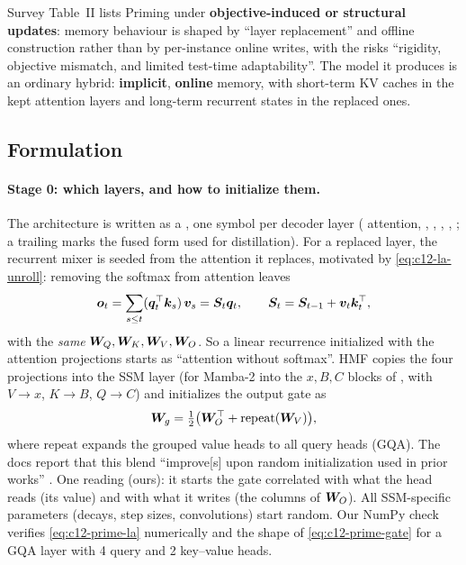 \begin{taxonomy}
Survey Table~II \citep{zhoubian2026memory} lists Priming under \textbf{objective-induced or
structural updates}: memory behaviour is shaped by ``layer replacement'' and offline construction
rather than by per-instance online writes, with the risks ``rigidity, objective mismatch, and
limited test-time adaptability''. The model it produces is an ordinary hybrid: \textbf{implicit},
\textbf{online} memory, with short-term KV caches in the kept attention layers and long-term
recurrent states in the replaced ones.
\end{taxonomy}

\subsection{Formulation}

\paragraph{Stage 0: which layers, and how to initialize them.} The architecture is written as a
, one symbol per decoder layer (\code{*} attention, ,
, , , ; a trailing \code{*} marks the fused form used for
distillation). For a replaced layer, the recurrent mixer is seeded from the attention it replaces,
motivated by \eqref{eq:c12-la-unroll}: removing the softmax from attention leaves
\begin{equation}\label{eq:c12-prime-la}
  \bm{o}_t = \sum_{s\le t}(\bm{q}_t^{\top}\bm{k}_s)\,\bm{v}_s = \bm{S}_t\bm{q}_t,\qquad \bm{S}_t = \bm{S}_{t-1} + \bm{v}_t\bm{k}_t^{\top},
\end{equation}
with the \emph{same} $\bm{W}_Q,\bm{W}_K,\bm{W}_V,\bm{W}_O$. So a linear recurrence initialized with the
attention projections starts as ``attention without softmax''. HMF copies the four projections into
the SSM layer (for Mamba-2 into the $x, B, C$ blocks of , with $V\to x$, $K\to B$,
$Q\to C$) and initializes the output gate as
\begin{equation}\label{eq:c12-prime-gate}
  \bm{W}_g = \tfrac12\big(\bm{W}_O^{\top} + \mathrm{repeat}(\bm{W}_V)\big),
\end{equation}
where $\mathrm{repeat}$ expands the grouped value heads to all query heads (GQA). The docs report
that this blend ``improve[s] upon random initialization used in prior works''
\citep{c12-wang2024mambainllama}. One reading (ours): it starts the gate correlated with what the
head reads (its value) and with what it writes (the columns of $\bm{W}_O$). All SSM-specific parameters
(decays, step sizes, convolutions) start random. Our NumPy check verifies
\eqref{eq:c12-prime-la} numerically and the shape of \eqref{eq:c12-prime-gate} for a GQA layer with
4 query and 2 key--value heads.

